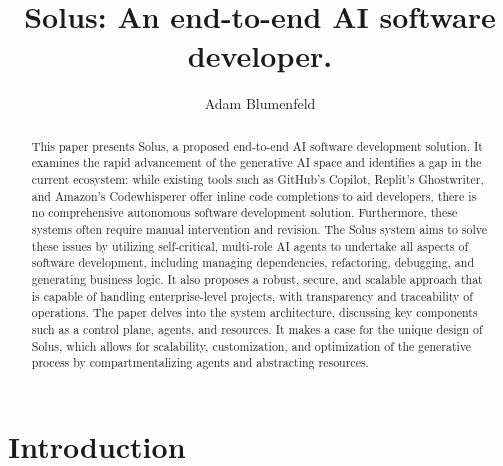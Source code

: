 \documentclass[a4paper,twocolumn,11pt]{quantumarticle}
\begin{document}
\title{Solus: An end-to-end AI software developer.}

\author{Adam Blumenfeld}
\maketitle

\begin{abstract}
  This paper presents Solus, a proposed end-to-end AI software development solution. It examines the rapid advancement of the generative AI space and identifies a gap in the current ecosystem: while existing tools such as GitHub's Copilot, Replit's Ghostwriter, and Amazon's Codewhisperer offer inline code completions to aid developers, there is no comprehensive autonomous software development solution. Furthermore, these systems often require manual intervention and revision. The Solus system aims to solve these issues by utilizing self-critical, multi-role AI agents to undertake all aspects of software development, including managing dependencies, refactoring, debugging, and generating business logic. It also proposes a robust, secure, and scalable approach that is capable of handling enterprise-level projects, with transparency and traceability of operations. The paper delves into the system architecture, discussing key components such as a control plane, agents, and resources. It makes a case for the unique design of Solus, which allows for scalability, customization, and optimization of the generative process by compartmentalizing agents and abstracting resources.
\end{abstract}
\section{Introduction}
\end{document}
